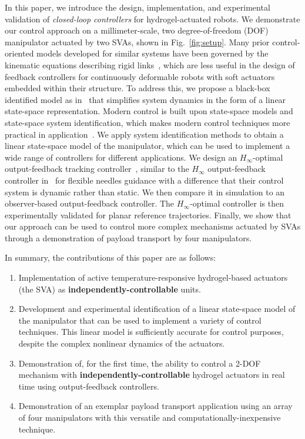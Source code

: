 In this paper, we introduce the design, implementation, and experimental validation of {\it closed-loop controllers} for hydrogel-actuated robots. We demonstrate our control approach on a millimeter-scale, two degree-of-freedom (DOF) manipulator actuated by two SVAs, shown in Fig.~\ref{fig:setup}. Many prior control-oriented models developed for similar systems have been governed by the kinematic equations describing rigid links~\cite{Webster2010,RezayatSorkhabadi2019}, which are less useful in the design of feedback controllers for continuously deformable robots with soft actuators embedded within their structure. To address this, we propose a black-box identified model as in~\cite{Ljung2010,Schaller2020} that simplifies system dynamics in the form of a linear state-space representation. Modern control is built upon state-space models and state-space system identification, which  makes modern control techniques more practical in application~\cite{Lim1998,Chinimilli2020}. We apply system identification methods to obtain a linear state-space model of the manipulator, which can be used to implement a wide range of controllers for different applications. We design an $H_{\infty}$-optimal output-feedback tracking controller~\cite{Aastrom2010},  similar to the $H_{\infty}$ output-feedback controller in~\cite{Farhamfard2016} for flexible needles guidance with a difference that their control system is dynamic rather than static. We then compare it in simulation to an observer-based output-feedback controller. The $H_{\infty}$-optimal controller is then experimentally validated for planar reference trajectories. Finally, we show that our approach can be used to control more complex mechanisms actuated by SVAs through a demonstration of payload transport by four manipulators.

In summary, the contributions of this paper are as follows:

\begin{enumerate}
    \item Implementation of active temperature-responsive hydrogel-based actuators (the SVA) as \textbf{independently-controllable} units. 
   \item Development and experimental identification of a linear state-space model of the manipulator that can be used to implement a variety of control techniques. This linear model is sufficiently accurate for control purposes, despite the complex nonlinear dynamics of the actuators.
    \item Demonstration of, for the first time, the ability to control a 2-DOF mechanism with \textbf{independently-controllable} hydrogel actuators in real time using output-feedback controllers. 
    \item Demonstration of an exemplar payload transport application using an array of four manipulators with this versatile and computationally-inexpensive technique.
\end{enumerate}

